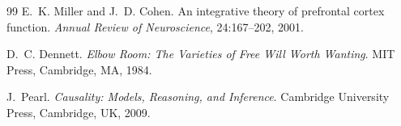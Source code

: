 \documentclass[11pt]{article}
\begin{document}
\begin{thebibliography}{99}
E.~K. Miller and J.~D. Cohen.
\newblock An integrative theory of prefrontal cortex function.
\newblock \emph{Annual Review of Neuroscience}, 24:167--202, 2001.

D.~C. Dennett.
\newblock \emph{Elbow Room: The Varieties of Free Will Worth Wanting}.
\newblock MIT Press, Cambridge, MA, 1984.

J.~Pearl.
\newblock \emph{Causality: Models, Reasoning, and Inference}.
\newblock Cambridge University Press, Cambridge, UK, 2009.

\end{thebibliography}
\end{document}
